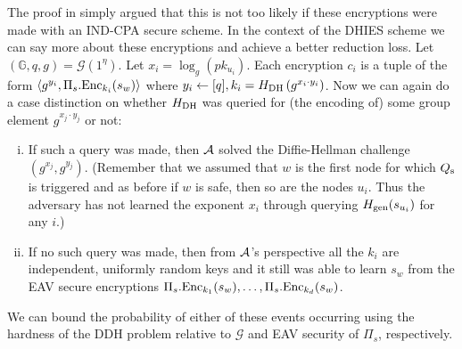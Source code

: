 The proof in \cite{ttkem} simply argued that this is not too likely if these encryptions were made with an IND-CPA secure scheme. In the context of the DHIES scheme we can say more about these encryptions and achieve a better reduction loss.
Let $(\mathbb{G}, q, g) = \mathcal{G}(1^\eta)$.
Let $x_i = \log_g(pk_{u_i})$. Each encryption $c_i$ is a tuple of the form $\langle g^{y_i}, \Pi_s.\mathrm{Enc}_{k_i}(s_w) \rangle$ where $y_i \leftarrow [q], k_i = H_\mathrm{DH}\left(g^{x_i \cdot y_i}\right)$. Now we can again do a case distinction on whether $H_\mathrm{DH}$ was queried for (the encoding of) some group element $g^{x_j \cdot y_j}$ or not:
\begin{enumerate}[(i)]
	\item \label{qs-triggered-case-1} If such a query was made, then $\mathcal{A}$ solved the Diffie-Hellman challenge $(g^{x_j}, g^{y_j})$. (Remember that we assumed that $w$ is the first node for which $Q_\mathrm{s}$ is triggered and as before if $w$ is safe, then so are the nodes $u_i$. Thus the adversary has not learned the exponent $x_i$ through querying $H_\mathrm{gen}(s_{u_i})$ for any $i$.)
	\item \label{qs-triggered-case-2} If no such query was made, then from $\mathcal{A}$'s perspective all the $k_i$ are independent, uniformly random keys and it still was able to learn $s_w$ from the EAV secure encryptions $\Pi_s.\mathrm{Enc}_{k_1}(s_w), \ldots, \Pi_s.\mathrm{Enc}_{k_d}(s_w)$.
\end{enumerate}
We can bound the probability of either of these events occurring using the hardness of the DDH problem relative to $\mathcal{G}$ and EAV security of $\Pi_s$, respectively.

